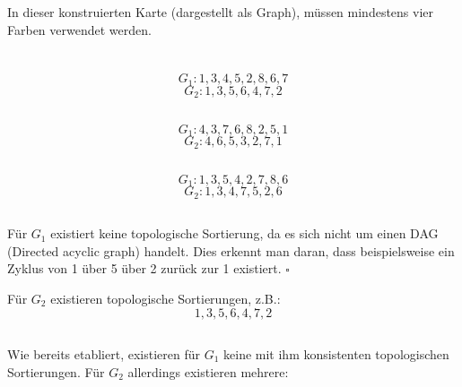 \documentclass[10pt,a4paper,oneside,ngerman,numbers=noenddot]{scrartcl}
\begin{document}
		\subsubsection{} %
			
			In dieser konstruierten Karte (dargestellt als Graph), müssen mindestens vier Farben verwendet werden.
\section{} %
	\subsection{} %
		\[
			G_{1}: 1, 3, 4, 5, 2, 8, 6, 7
		\]
		\[
			G_{2}: 1, 3, 5, 6, 4, 7, 2
		\]
	\subsection{} %
		\[
			G_{1}: 4, 3, 7, 6, 8, 2, 5, 1
		\]
		\[
			G_{2}: 4, 6, 5, 3, 2, 7, 1
		\]
	\subsection{} %
		\[
			G_{1}: 1, 3, 5, 4, 2, 7, 8, 6
		\]
		\[
			G_{2}: 1, 3, 4, 7, 5, 2, 6
		\]
	\subsection{} %
            Für $G_1$ existiert keine topologische Sortierung, da es sich nicht um einen DAG (Directed acyclic graph) handelt. Dies erkennt man daran, dass beispielsweise ein Zyklus von 1 über 5 über 2 zurück zur 1 existiert. $\square$
            
            Für $G_2$ existieren topologische Sortierungen, z.B.:
            \[
                1, 3, 5, 6, 4, 7, 2
            \]
        \subsection{} %
            Wie  bereits etabliert, existieren für $G_1$ keine mit ihm konsistenten topologischen Sortierungen. Für $G_2$ allerdings existieren mehrere:
            
\end{document}
